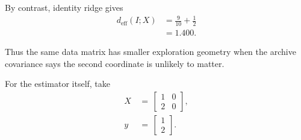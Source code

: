 \documentclass{article} %
\begin{document}
By contrast, identity ridge gives
\begin{equation}
\label{eq:hyper-example-identity}
\begin{aligned}
d_{\mathrm{eff}}(I;X)
&=
\frac{9}{10}+\frac{1}{2}
\\
&=
1.400 .
\end{aligned}
\end{equation}

Thus the same data matrix has smaller exploration geometry when the archive covariance says the second coordinate is unlikely to matter.

For the estimator itself, take
\begin{align}
X
&\,=\,
\begin{bmatrix}
1&0\\
2&0
\end{bmatrix},
\label{eq:hyper-example-X}
\\
y
&\,=\,
\begin{bmatrix}
1\\
2
\end{bmatrix}.
\label{eq:hyper-example-y}
\end{align}
\end{document}
